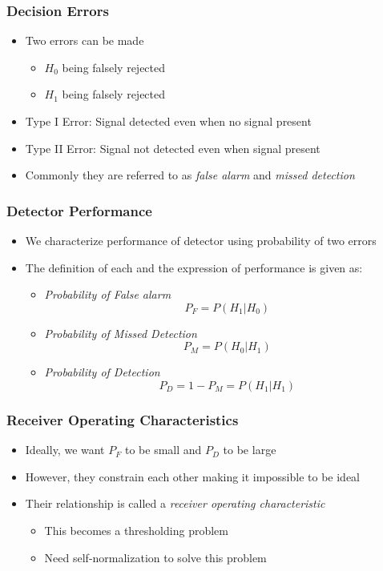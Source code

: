 \documentclass[10pt]{beamer}
\begin{document}
\frame
{
  \frametitle{Decision Errors}

    \begin{itemize}
        \item Two errors can be made
        \begin{itemize}
          \item $H_0$ being falsely rejected
          \item $H_1$ being falsely rejected
        \end{itemize}
        \item Type I Error: Signal detected even when no signal present 
        \item Type II Error: Signal not detected even when signal present
        \item Commonly they are referred to as \textit{false alarm} and \textit{missed detection}
    \end{itemize}

}

\frame
{
  \frametitle{Detector Performance}

    \begin{itemize}
        \item We characterize performance of detector using probability of two errors
        \item The definition of each and the expression of performance is given as:
        \begin{itemize}
        \item \textit{Probability of False alarm}
        \begin{equation}
            P_F = P(H_1|H_0)
        \end{equation}
	\item \textit{Probability of Missed Detection}
        \begin{equation}
        P_M = P(H_0|H_1)
        \end{equation}
        \item \textit{Probability of Detection}
        \begin{equation}
        P_D = 1-P_M = P(H_1|H_1)
        \end{equation}
        \end{itemize}
    \end{itemize}

}

\frame
{
  \frametitle{Receiver Operating Characteristics}

    \begin{itemize}
        \item Ideally, we want $P_F$ to be small and $P_D$ to be large 
        \item However, they constrain each other making it impossible to be ideal
        \item Their relationship is called a \textit{receiver operating characteristic}
            \begin{itemize}
        \item This becomes a thresholding problem
	\item Need self-normalization to solve this problem
    \end{itemize}
    \end{itemize}

}
\end{document}
